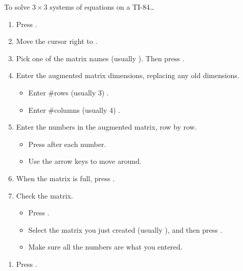 \newpage%
\begin{center}
\begin{minipage}[t]{1\textwidth}

\begin{myConcept}{To solve $3\times3$ systems of equations on a {TI-84}\dots}
    \begin{enumerate}%
        \item Press  .
        \item Move the cursor right to {\ttfamily [EDIT]}.
        \item Pick one of the matrix names (usually {\ttfamily [A]}). 
            Then press .
        \item Enter the augmented matrix dimensions, replacing any old dimensions.
            \begin{itemize}
                \item Enter \#rows (usually 3) .
                \item Enter \#columns (usually 4) .
            \end{itemize}
        \item Enter the numbers in the augmented matrix,
            row by row.
            \begin{itemize}
                \item Press  after each number.
                \item Use the arrow keys to move around.
            \end{itemize}
        \item When the matrix is full, press  .
        \item Check the matrix.
            \begin{itemize}
                \item Press  .
                \item Select the matrix you just created (usually {\ttfamily [A]}),
                    and then press .
                \item Make sure all the numbers are what you entered.
            \end{itemize}
    \end{enumerate}
    \begin{enumerate}
        \item Press  .

\end{enumerate}
\end{myConcept}
\end{minipage}
\end{center}
